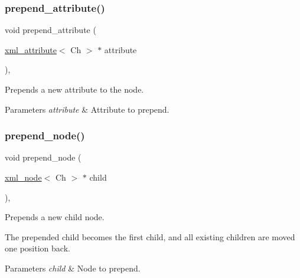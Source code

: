 \subsubsection{\texorpdfstring{prepend\+\_\+attribute()}{prepend\_attribute()}}
{\footnotesize\ttfamily void prepend\+\_\+attribute (\begin{DoxyParamCaption}\item[{\mbox{\hyperlink{classrapidxml_1_1xml__attribute}{xml\+\_\+attribute}}$<$ Ch $>$ $\ast$}]{attribute }\end{DoxyParamCaption})\hspace{0.3cm}{\ttfamily [inline]}, {\ttfamily [inherited]}}



Prepends a new attribute to the node. 


\begin{DoxyParams}{Parameters}
{\em attribute} & Attribute to prepend. \\
\hline
\end{DoxyParams}
\mbox{\label{classrapidxml_1_1xml__node_a0c39df6617e709eb2fba11300dea63f2}} 
\subsubsection{\texorpdfstring{prepend\+\_\+node()}{prepend\_node()}}
{\footnotesize\ttfamily void prepend\+\_\+node (\begin{DoxyParamCaption}\item[{\mbox{\hyperlink{classrapidxml_1_1xml__node}{xml\+\_\+node}}$<$ Ch $>$ $\ast$}]{child }\end{DoxyParamCaption})\hspace{0.3cm}{\ttfamily [inline]}, {\ttfamily [inherited]}}



Prepends a new child node. 

The prepended child becomes the first child, and all existing children are moved one position back. 
\begin{DoxyParams}{Parameters}
{\em child} & Node to prepend. \\
\hline
\end{DoxyParams}
\mbox{\label{classrapidxml_1_1xml__node_a5fd85382924d5c9bd6dc375855db5344}} 
